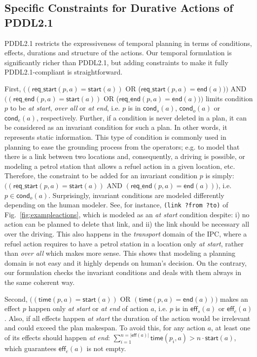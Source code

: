 \documentclass[runningheads]{llncs}
\newcommand{\eff}{\mathsf{eff}}    %
\newcommand{\cond}{\mathsf{cond}}  %
\newcommand{\start}{\mathsf{start}}%
\newcommand{\en}{\mathsf{end}}     %
\newcommand{\tim}{\mathsf{time}}   %
\newcommand{\reqs}{\mathsf{req\_{start}}} %
\newcommand{\reqe}{\mathsf{req\_{end}}}   %
\begin{document}
\subsection{Specific Constraints for Durative Actions of PDDL2.1}
\label{sec:PDDL21constraints}
PDDL2.1 restricts the expressiveness of temporal planning in terms of conditions, effects, durations and structure of the actions. Our temporal formulation is significantly richer than PDDL2.1, but adding constraints to make it fully PDDL2.1-compliant is straightforward.


First, $((\reqs(p,a) = \start(a))$ OR ($\reqs(p,a) = \en(a)))$ AND $((\reqe(p,a) = \start(a))$ OR ($\reqe(p,a) = \en(a)))$ limits condition $p$ to be \emph{at start}, \emph{over all} or \emph{at end}, i.e. $p$ is in $\cond_s(a)$, $\cond_o(a)$ or $\cond_e(a)$, respectively.
Further, if a condition is never deleted in a plan, it can be considered as an invariant condition for such a plan. In other words, it represents static information. This type of condition is commonly used in planning to ease the grounding process from the operators; e.g. to model that there is a link between two locations and, consequently, a driving is possible, or modeling a petrol station that allows a refuel action in a given location, etc. Therefore, the constraint to be added for an invariant condition $p$ is simply: $((\reqs(p,a) = \start(a))$ AND $(\reqe(p,a) = \en(a)))$, i.e. $p \in \cond_o(a)$.
Surprisingly, invariant conditions are modeled differently depending on the human modeler. See, for instance, \texttt{(link ?from ?to)} of Fig.~\ref{fig:exampleactions}, which is modeled as an \emph{at start} condition despite: i) no action can be planned to delete that link, and ii) the link should be necessary all over the driving.
This also happens in the \emph{transport} domain of the IPC, where a refuel action requires to have a petrol station in a location only \emph{at start}, rather than \emph{over all} which makes more sense. This shows that modeling a planning domain is not easy and it highly depends on human's decision. On the contrary, our formulation checks the invariant conditions and deals with them always in the same coherent way.


Second, $((\tim(p,a) = \start(a))$ OR $(\tim(p,a) = \en(a)))$ makes an effect $p$ happen only \emph{at start} or \emph{at end} of action $a$, i.e. $p$ is in $\eff_s(a)$ or $\eff_e(a)$.
Also, if all effects happen \emph{at start} the duration of the action would be irrelevant and could exceed the plan makespan. To avoid this, for any action $a$, at least one of its effects should happen \emph{at end}: $\sum_{i=1}^{n =|\eff(a)|} \tim(p_i,a) > n \cdot \start(a)$, which guarantees $\eff_e(a)$ is not empty.
\end{document}
